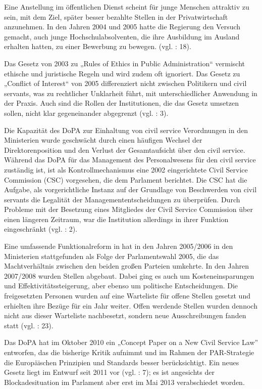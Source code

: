 Eine Anstellung im öffentlichen Dienst scheint für junge Menschen attraktiv zu sein, mit dem Ziel, später besser bezahlte Stellen in der Privatwirtschaft anzunehmen. In den Jahren 2004 und 2005 hatte die Regierung den Versuch gemacht, auch junge Hochschulabsolventen, die ihre Ausbildung im Ausland erhalten hatten, zu einer Bewerbung zu bewegen. (vgl. \cite{oecd09}: 18).\par
Das Gesetz von 2003 zu „Rules of Ethics in Public Administration“ vermischt ethische und juristische Regeln und wird zudem oft ignoriert. Das Gesetz zu „Conflict of Interest“ von 2005 differenziert nicht zwischen Politikern und civil servants, was zu rechtlicher Unklarheit führt, mit unterschiedlicher Anwendung in der Praxis. Auch sind die Rollen der Institutionen, die das Gesetz umsetzen sollen, nicht klar gegeneinander abgegrenzt (vgl. \cite{oecd09}: 3). \par
Die Kapazität des DoPA zur Einhaltung von civil service Verordnungen in den Ministerien wurde geschwächt durch einen häufigen Wechsel der Direktorenposition und den Verlust der Gesamtaufsicht über den civil service. Während das DoPA für das Management des Personalwesens für den civil service zuständig ist, ist als Kontrollmechanismus eine 2002 eingerichtete Civil Service Commission (CSC) vorgesehen, die dem Parlament berichtet. Die CSC hat die Aufgabe, als vorgerichtliche Instanz auf der Grundlage von Beschwerden von civil servants die Legalität der Managemententscheidungen zu überprüfen. Durch Probleme mit der Besetzung eines Mitgliedes der Civil Service Commission über einen längeren Zeitraum, war die Institution allerdings in ihrer Funktion eingeschränkt (vgl. \cite{oecd10b}: 2).\par
Eine umfassende Funktionalreform in hat in den Jahren 2005/2006 in den Ministerien stattgefunden als Folge der Parlamentswahl 2005, die das Machtverhältnis zwischen den beiden großen Parteien umkehrte. In den Jahren 2007/2008 wurden Stellen abgebaut. Dabei ging es auch um Kosteneinsparungen und Effektivitätssteigerung, aber ebenso um politische Entscheidungen. Die freigesetzten Personen wurden auf eine Warteliste für offene Stellen gesetzt und erhielten ihre Bezüge für ein Jahr weiter. Offen werdende Stellen wurden dennoch nicht aus dieser Warteliste nachbesetzt, sondern neue Ausschreibungen fanden statt (vgl.  \cite{oecd09}: 23).\par
Das DoPA hat im Oktober 2010 ein „Concept Paper on a New Civil Service Law” entworfen, das die bisherige Kritik aufnimmt und im Rahmen der PAR-Strategie die Europäischen Prinzipien und Standards besser berücksichtigt. Ein neues Gesetz liegt im Entwurf seit 2011 vor (vgl. \cite{oecd11b}: 7); es ist angesichts der Blockadesituation im Parlament aber erst im Mai 2013 verabschiedet worden.\par
